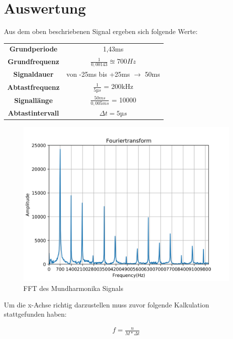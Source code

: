 \documentclass[12pt, oneside, a4paper, \docLanguage]{report}
\begin{document}
\section{Auswertung}
\label{chap:VERSUCH_1_AUSWERTUNG}
\begin{normalsize}
Aus dem oben beschriebenen Signal ergeben sich folgende Werte:
\end{normalsize}
\begin{center}
	\begin{tabular}{ c c }
	\textbf{Grundperiode} & 1,43ms \\ 
	\textbf{Grundfrequenz} & $\frac{1}{0,00143}\approxeq700Hz$ \\  
	\textbf{Signaldauer} & von -25ms bis +25ms $\rightarrow$ 50ms \\ 
	\textbf{Abtastfrequenz} & $\frac{1}{5µs}$ = 200kHz \\ 
	\textbf{Signallänge} & $\frac{50ms}{0,005ms}$ = 10000\\
	\textbf{Abtastintervall} & $\Delta t = 5µs$ \\ 
	\end{tabular}
\end{center}
\pagebreak
\begin{figure}[H]
\includegraphics[width=1\textwidth]{../MundTransformed.png}
\caption{FFT des Mundharmonika Signals}
\end{figure}
\begin{normalsize}
Um die x-Achse richtig darzustellen muss zuvor folgende Kalkulation stattgefunden haben:
\end{normalsize}
\begin{align*}
f = \frac{n}{M * \Delta t}
\end{align*}
\end{document}
